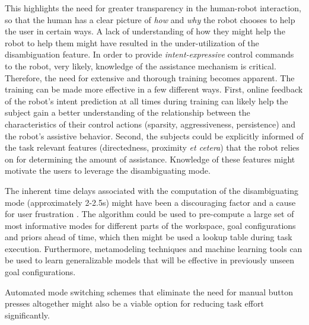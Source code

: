 \documentclass[journal]{IEEEtran}
\begin{document}
This highlights the need for greater transparency in the human-robot interaction, so that the human has a clear picture of \textit{how} and \textit{why} the robot chooses to help the user in certain ways. A lack of understanding of how they might help the robot to help them might have resulted in the under-utilization of the disambiguation feature. In order to provide \textit{intent-expressive} control commands to the robot, very likely, knowledge of the assistance mechanism is critical.  
Therefore, the need for extensive and thorough training becomes apparent.
The training can be made more effective in a few different ways. First, online feedback of the robot's intent prediction at all times during training can likely help the subject gain a better understanding of the relationship between the characteristics of their control actions (sparsity, aggressiveness, persistence) and the robot's assistive behavior. Second, the subjects could be explicitly informed of the task relevant features (directedness, proximity \textit{et cetera}) that the robot relies on for determining the amount of assistance. Knowledge of these features might motivate the users to leverage the disambiguating mode. 

The inherent time delays associated with the computation of the disambiguating mode (approximately 2-2.5s) might have been a discouraging factor and a cause for user frustration . The algorithm could be used to pre-compute a large set of most informative modes for different parts of the workspace, goal configurations and priors ahead of time, which then might be used a lookup table during task execution. 
Furthermore, metamodeling techniques and machine learning tools can be used to learn generalizable models that will be effective in previously unseen goal configurations. 

Automated mode switching schemes that eliminate the need for manual button presses altogether might also be a viable option for reducing task effort significantly.
\end{document}
